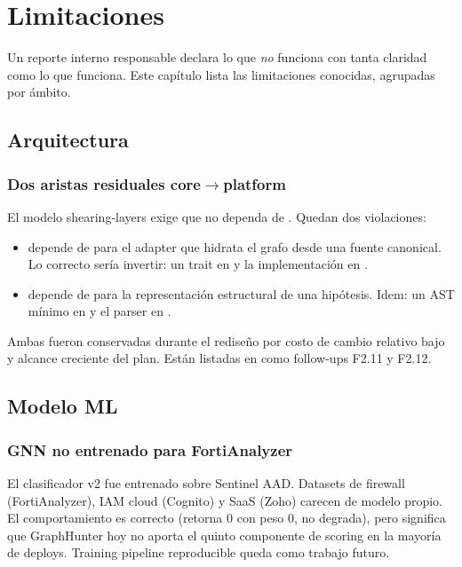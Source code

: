 \chapter{Limitaciones}
\label{sec:paper-limites}

Un reporte interno responsable declara lo que \emph{no} funciona
con tanta claridad como lo que funciona. Este capítulo lista las
limitaciones conocidas, agrupadas por ámbito.

\section{Arquitectura}

\subsection*{Dos aristas residuales core$\to$platform}

El modelo shearing-layers exige que  no dependa de
. Quedan dos violaciones:

\begin{itemize}
    \item {} depende de
     para el adapter que hidrata el grafo
    desde una fuente canonical. Lo correcto sería invertir: un
    trait  en  y la
    implementación en .
    \item {} depende de 
    para la representación estructural de una hipótesis. Idem:
    un AST mínimo en  y el parser en .
\end{itemize}

Ambas fueron conservadas durante el rediseño por costo de cambio
relativo bajo y alcance creciente del plan. Están listadas en
 como follow-ups
F2.11 y F2.12.

\section{Modelo ML}

\subsection*{GNN no entrenado para FortiAnalyzer}

El clasificador v2 fue entrenado sobre Sentinel AAD. Datasets de
firewall (FortiAnalyzer), IAM cloud (Cognito) y SaaS (Zoho)
carecen de modelo propio. El comportamiento es correcto (retorna
0 con peso 0, no degrada), pero significa que GraphHunter hoy no
aporta el quinto componente de scoring en la mayoría de
deploys. Training pipeline reproducible queda como trabajo
futuro.

